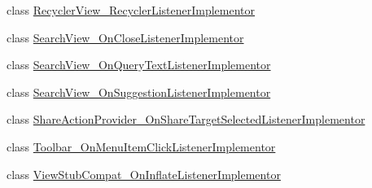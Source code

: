 \begin{CompactItemize}
\item 
class \hyperlink{classmono_1_1android_1_1support_1_1v7_1_1widget_1_1_recycler_view___recycler_listener_implementor}{RecyclerView\_\-RecyclerListenerImplementor}
\item 
class \hyperlink{classmono_1_1android_1_1support_1_1v7_1_1widget_1_1_search_view___on_close_listener_implementor}{SearchView\_\-OnCloseListenerImplementor}
\item 
class \hyperlink{classmono_1_1android_1_1support_1_1v7_1_1widget_1_1_search_view___on_query_text_listener_implementor}{SearchView\_\-OnQueryTextListenerImplementor}
\item 
class \hyperlink{classmono_1_1android_1_1support_1_1v7_1_1widget_1_1_search_view___on_suggestion_listener_implementor}{SearchView\_\-OnSuggestionListenerImplementor}
\item 
class \hyperlink{classmono_1_1android_1_1support_1_1v7_1_1widget_1_1_share_action_provider___on_share_target_selected_listener_implementor}{ShareActionProvider\_\-OnShareTargetSelectedListenerImplementor}
\item 
class \hyperlink{classmono_1_1android_1_1support_1_1v7_1_1widget_1_1_toolbar___on_menu_item_click_listener_implementor}{Toolbar\_\-OnMenuItemClickListenerImplementor}
\item 
class \hyperlink{classmono_1_1android_1_1support_1_1v7_1_1widget_1_1_view_stub_compat___on_inflate_listener_implementor}{ViewStubCompat\_\-OnInflateListenerImplementor}
\end{CompactItemize}
